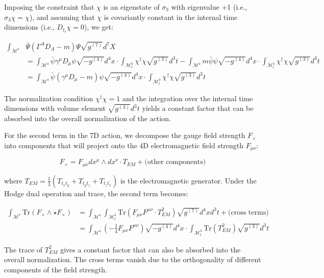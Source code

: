 \documentclass{article}
\begin{document}
Imposing the constraint that $\chi$ is an eigenstate of $\sigma_3$ with eigenvalue +1 (i.e., $\sigma_3 \chi = \chi$), and assuming that $\chi$ is covariantly constant in the internal time dimensions (i.e., $D_{t_i} \chi = 0$), we get:

\begin{align}
\int_{\mathcal{M}^7} &\bar{\Psi} (\Gamma^A D_A - m) \Psi \sqrt{g^{(7)}} d^7X \\
&= \int_{\mathcal{M}^4} \bar{\psi} \gamma^\mu D_\mu \psi \sqrt{-g^{(4)}} d^4x \cdot \int_{\mathcal{M}^3_t} \chi^\dagger \chi \sqrt{g^{(3)}} d^3t - \int_{\mathcal{M}^4} m\bar{\psi} \psi \sqrt{-g^{(4)}} d^4x \cdot \int_{\mathcal{M}^3_t} \chi^\dagger \chi \sqrt{g^{(3)}} d^3t \\
&= \int_{\mathcal{M}^4} \bar{\psi} (\gamma^\mu D_\mu - m) \psi \sqrt{-g^{(4)}} d^4x \cdot \int_{\mathcal{M}^3_t} \chi^\dagger \chi \sqrt{g^{(3)}} d^3t
\end{align}

The normalization condition $\chi^\dagger \chi = 1$ and the integration over the internal time dimensions with volume element $\sqrt{g^{(3)}} d^3t$ yields a constant factor that can be absorbed into the overall normalization of the action.

For the second term in the 7D action, we decompose the gauge field strength $F_{\times}$ into components that will project onto the 4D electromagnetic field strength $F_{\mu\nu}$:

\begin{equation}
F_{\times} = F_{\mu\nu} dx^\mu \wedge dx^\nu \cdot T_{EM} + \text{(other components)}
\end{equation}

where $T_{EM} = \frac{1}{3}(T_{t_x t_y} + T_{t_y t_z} + T_{t_z t_x})$ is the electromagnetic generator. Under the Hodge dual operation and trace, the second term becomes:

\begin{align}
\int_{\mathcal{M}^7} \text{Tr}(F_{\times} \wedge \star F_{\times}) &= \int_{\mathcal{M}^4} \int_{\mathcal{M}^3_t} \text{Tr}(F_{\mu\nu} F^{\mu\nu} \cdot T_{EM}^2) \sqrt{g^{(7)}} d^4x d^3t + \text{(cross terms)} \\
&= \int_{\mathcal{M}^4} \left(-\frac{1}{4} F_{\mu\nu} F^{\mu\nu}\right) \sqrt{-g^{(4)}} d^4x \cdot \int_{\mathcal{M}^3_t} \text{Tr}(T_{EM}^2) \sqrt{g^{(3)}} d^3t
\end{align}

The trace of $T_{EM}^2$ gives a constant factor that can also be absorbed into the overall normalization. The cross terms vanish due to the orthogonality of different components of the field strength.
\end{document}
